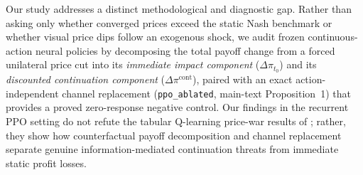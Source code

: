 Our study addresses a distinct methodological and diagnostic gap. Rather than asking only whether converged prices exceed the static Nash benchmark or whether visual price dips follow an exogenous shock, we audit frozen continuous-action neural policies by decomposing the total payoff change from a forced unilateral price cut into its \emph{immediate impact component} ($\Delta\pi_{t_0}$) and its \emph{discounted continuation component} ($\Delta\pi^{\mathrm{cont}}$), paired with an exact action-independent channel replacement (\texttt{ppo\_ablated}, main-text Proposition~1) that provides a proved zero-response negative control. Our findings in the recurrent PPO setting do not refute the tabular Q-learning price-war results of \citet{calvano2021algorithmic}; rather, they show how counterfactual payoff decomposition and channel replacement separate genuine information-mediated continuation threats from immediate static profit losses.

